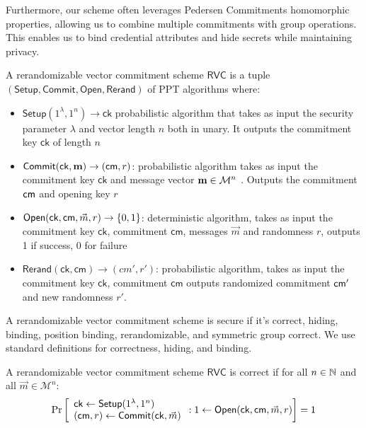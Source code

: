 \noindent Furthermore, our scheme often leverages Pedersen Commitments homomorphic properties, allowing us to combine multiple commitments with group operations. This enables us to bind credential attributes and hide secrets while maintaining privacy. 



\begin{definition} 
    A rerandomizable vector commitment scheme $\mathsf{RVC}$ is a tuple $(\mathsf{Setup}, \mathsf{Commit}, \mathsf{Open}, \mathsf{Rerand})$ of PPT algorithms where:
    
    \begin{itemize}
        \item $\mathsf{Setup}(1^\lambda, 1^n) \to \mathsf{ck}$ probabilistic algorithm that takes as input the security parameter $\lambda$ and vector length $n$ both in unary. It outputs the commitment key $\mathsf{ck}$ of length $n$
        
        \item $\mathsf{Commit}(\mathsf{ck}, \textbf{m}) \to (\mathsf{cm}, r)$: probabilistic algorithm takes as input the commitment key $\mathsf{ck}$ and message vector $\textbf{m} \in \mathcal{M}^n$ . Outputs the commitment $\mathsf{cm}$ and opening key $r$

        \item $\mathsf{Open}(\mathsf{ck, cm}, \vec{m}, r) \to \{0,1\}$: deterministic algorithm, takes as input the commitment key $\mathsf{ck}$, commitment $\mathsf{cm}$, messages $\vec{m}$ and randomness $r$, outputs 1 if success, 0 for failure

        \item $\mathsf{Rerand}(\mathsf{ck, cm}) \to (cm', r')$: probabilistic algorithm, takes as input the commitment key $\mathsf{ck}$, commitment $\mathsf{cm}$ outputs randomized commitment $\mathsf{cm}'$ and new randomness $r'$. 
        
    \end{itemize}
\end{definition}

\noindent A rerandomizable vector commitment scheme is secure if it's correct, hiding, binding, position binding, rerandomizable, and symmetric group correct. We use standard definitions for correctness, hiding, and binding.


\begin{definition}[Correctness] A rerandomizable vector commitment scheme $\mathsf{RVC}$ is correct if for all $n \in \mathbb{N}$ and all $\vec{m} \in \mathcal{M}^n$:
        \[
        \Pr
            \left [
                \begin{array}{l}
                    \mathsf{ck} \gets \mathsf{Setup}(1^\lambda, 1^n) \\
                    (\mathsf{cm}, r) \gets \mathsf{Commit}(\mathsf{ck}, \vec{m}) \\
                \end{array}
                : 1 \gets \mathsf{Open}(\mathsf{ck}, \mathsf{cm}, \vec{m}, r)
            \right ] = 1
    \]
\end{definition}



